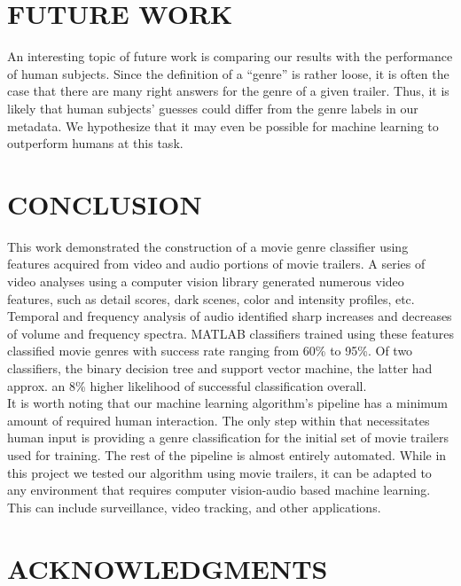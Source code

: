 \documentclass[letterpaper, 10 pt, conference]{ieeeconf}  %
\begin{document}
\section{FUTURE WORK}
An interesting topic of future work is comparing our results with the performance of human subjects. Since the definition of a “genre” is rather loose, it is often the case that there are many right answers for the genre of a given trailer. Thus, it is likely that human subjects’ guesses could differ from the genre labels in our metadata. We hypothesize that it may even be possible for machine learning to outperform humans at this task.


\section{CONCLUSION}
This work demonstrated the construction of a movie genre classifier using features acquired from video and audio portions of movie trailers. A series of video analyses using a computer vision library generated numerous video features, such as detail scores, dark scenes, color and intensity profiles, etc. Temporal and frequency analysis of audio identified sharp increases and decreases of volume and frequency spectra. MATLAB classifiers trained using these features classified movie genres with success rate ranging from 60\% to 95\%. Of two classifiers, the binary decision tree and support vector machine, the latter had approx. an 8\% higher likelihood of successful classification overall. \\
It is worth noting that our machine learning algorithm’s pipeline has a minimum amount of required human interaction. The only step within that necessitates human input is providing a genre classification for the initial set of movie trailers used for training. The rest of the pipeline is almost entirely automated. While in this project we tested our algorithm using movie trailers, it can be adapted to any environment that requires computer vision-audio based machine learning. This can include surveillance, video tracking, and other applications.




\section{ACKNOWLEDGMENTS}
\end{document}

